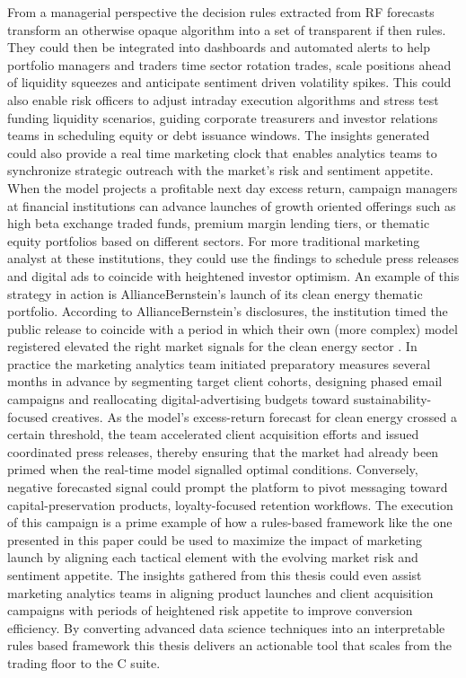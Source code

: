From a managerial perspective the decision rules extracted from RF forecasts transform an otherwise opaque algorithm into a set of transparent if then rules. They could then be integrated into dashboards and automated alerts to help portfolio managers and traders time sector rotation trades, scale positions ahead of liquidity squeezes and anticipate sentiment driven volatility spikes. This could also enable risk officers to adjust intraday execution algorithms and stress test funding liquidity scenarios, guiding corporate treasurers and investor relations teams in scheduling equity or debt issuance windows. The insights generated could also provide a real time marketing clock that enables analytics teams to synchronize strategic outreach with the market's risk and sentiment appetite. When the model projects a profitable next day excess return, campaign managers at financial institutions can advance launches of growth oriented offerings such as high beta exchange traded funds, premium margin lending tiers, or thematic equity portfolios based on different sectors. For more traditional marketing analyst at these institutions, they could use the findings to schedule press releases and digital ads to coincide with heightened investor optimism. An example of this strategy in action is AllianceBernstein's launch of its clean energy thematic portfolio. According to AllianceBernstein's disclosures, the institution timed the public release to coincide with a period in which their own (more complex) model registered elevated the right market signals for the clean energy sector \cite{alliance_2024}. In practice the marketing analytics team initiated preparatory measures several months in advance by segmenting target client cohorts, designing phased email campaigns and reallocating digital-advertising budgets toward sustainability-focused creatives. As the model's excess-return forecast for clean energy crossed a certain threshold, the team accelerated client acquisition efforts and issued coordinated press releases, thereby ensuring that the market had already been primed when the real-time model signalled optimal conditions. Conversely, negative forecasted signal could prompt the platform to pivot messaging toward capital-preservation products, loyalty-focused retention workflows. The execution of this campaign is a prime example of how a rules-based framework like the one presented in this paper could be used to maximize the impact of marketing launch by aligning each tactical element with the evolving market risk and sentiment appetite. The insights gathered from this thesis could even assist marketing analytics teams in aligning product launches and client acquisition campaigns with periods of heightened risk appetite to improve conversion efficiency. By converting advanced data science techniques into an interpretable rules based framework this thesis delivers an actionable tool that scales from the trading floor to the C suite.

